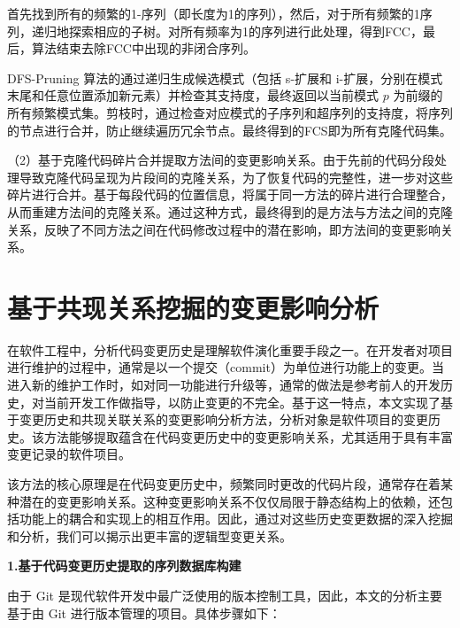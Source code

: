 首先找到所有的频繁的1-序列（即长度为1的序列），然后，对于所有频繁的1序列，递归地探索相应的子树。对所有频率为1的序列进行此处理，得到FCC，最后，算法结束去除FCC中出现的非闭合序列。
    

DFS-Pruning 算法的通过递归生成候选模式（包括 s-扩展和 i-扩展，分别在模式末尾和任意位置添加新元素）并检查其支持度，最终返回以当前模式 $p$ 为前缀的所有频繁模式集。剪枝时，通过检查对应模式的子序列和超序列的支持度，将序列的节点进行合并，防止继续遍历冗余节点。最终得到的FCS即为所有克隆代码集。

（2）基于克隆代码碎片合并提取方法间的变更影响关系。由于先前的代码分段处理导致克隆代码呈现为片段间的克隆关系，为了恢复代码的完整性，进一步对这些碎片进行合并。基于每段代码的位置信息，将属于同一方法的碎片进行合理整合，从而重建方法间的克隆关系。通过这种方式，最终得到的是方法与方法之间的克隆关系，反映了不同方法之间在代码修改过程中的潜在影响，即方法间的变更影响关系。

\section{基于共现关系挖掘的变更影响分析}

在软件工程中，分析代码变更历史是理解软件演化重要手段之一。在开发者对项目进行维护的过程中，通常是以一个提交（commit）为单位进行功能上的变更。当进入新的维护工作时，如对同一功能进行升级等，通常的做法是参考前人的开发历史，对当前开发工作做指导，以防止变更的不完全。基于这一特点，本文实现了基于变更历史和共现关联关系的变更影响分析方法，分析对象是软件项目的变更历史。该方法能够提取蕴含在代码变更历史中的变更影响关系，尤其适用于具有丰富变更记录的软件项目。

该方法的核心原理是在代码变更历史中，频繁同时更改的代码片段，通常存在着某种潜在的变更影响关系。这种变更影响关系不仅仅局限于静态结构上的依赖，还包括功能上的耦合和实现上的相互作用。因此，通过对这些历史变更数据的深入挖掘和分析，我们可以揭示出更丰富的逻辑型变更关系。

\noindent \textbf{1.基于代码变更历史提取的序列数据库构建}

由于 Git 是现代软件开发中最广泛使用的版本控制工具，因此，本文的分析主要基于由 Git 进行版本管理的项目。具体步骤如下：

